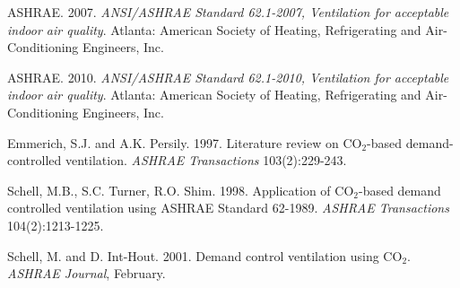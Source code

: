 ASHRAE. 2007. \emph{ANSI/ASHRAE Standard 62.1-2007, Ventilation for acceptable indoor air quality}. Atlanta: American Society of Heating, Refrigerating and Air-Conditioning Engineers, Inc.

ASHRAE. 2010. \emph{ANSI/ASHRAE Standard 62.1-2010, Ventilation for acceptable indoor air quality}. Atlanta: American Society of Heating, Refrigerating and Air-Conditioning Engineers, Inc.

Emmerich, S.J. and A.K. Persily. 1997. Literature review on CO\(_{2}\)-based demand-controlled ventilation. \emph{ASHRAE Transactions} 103(2):229-243.

Schell, M.B., S.C. Turner, R.O. Shim. 1998. Application of CO\(_{2}\)-based demand controlled ventilation using ASHRAE Standard 62-1989. \emph{ASHRAE Transactions} 104(2):1213-1225.

Schell, M. and D. Int-Hout. 2001. Demand control ventilation using CO\(_{2}\). \emph{ASHRAE Journal}, February.
